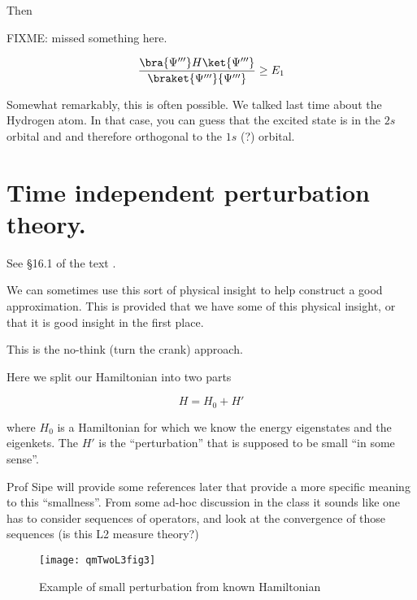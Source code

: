 
Then

FIXME: missed something here.

\begin{equation}\label{eqn:qmTwoL3:290}
\frac{
\bra{\Psi'''} H \ket{\Psi'''}
}
{
\braket{\Psi'''}{\Psi'''}
} 
\ge E_1
\end{equation}

Somewhat remarkably, this is often possible.  We talked last time about the Hydrogen atom.  In that case, you can guess that the excited state is in the $2s$ orbital and and therefore orthogonal to the $1s$ (?) orbital.  

\section{Time independent perturbation theory.}

See \S 16.1 of the text \cite{desai2009quantum}.

We can sometimes use this sort of physical insight to help construct a good approximation.  This is provided that we have some of this physical insight, or that it is good insight in the first place.

This is the no-think (turn the crank) approach.

Here we split our Hamiltonian into two parts

\begin{equation}\label{eqn:qmTwoL3:310}
H = H_0 + H'
\end{equation}

where $H_0$ is a Hamiltonian for which we know the energy eigenstates and the eigenkets.  The $H'$ is the ``perturbation'' that is supposed to be small ``in some sense''.

Prof Sipe will provide some references later that provide a more specific meaning to this ``smallness''.  From some ad-hoc discussion in the class it sounds like one has to consider sequences of operators, and look at the convergence of those sequences (is this L2 measure theory?)

\begin{figure}[htp]
\centering
\texttt{[image: qmTwoL3fig3]}
\caption{Example of small perturbation from known Hamiltonian}\label{fig:qmTwoL3fig3}
\end{figure}

